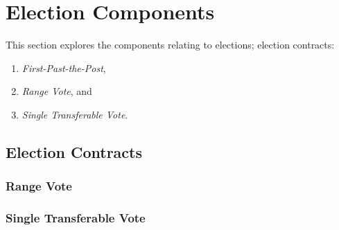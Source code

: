 \section{Election Components}

This section explores the components relating to elections; election contracts:

\begin{enumerate}
  \item \emph{First-Past-the-Post},
  \item \emph{Range Vote}, and
  \item \emph{Single Transferable Vote}.
\end{enumerate}




\subsection{Election Contracts}



\subsubsection{Range Vote}

\subsubsection{Single Transferable Vote}
